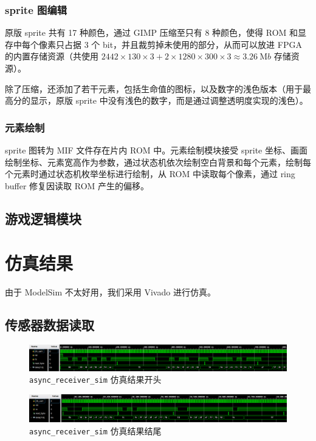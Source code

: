 \documentclass[UTF8, 11pt, fontset=none]{ctexart}
\begin{document}
\subsubsection{sprite 图编辑}

原版 sprite 共有 17 种颜色，通过 GIMP 压缩至只有 8 种颜色，使得 ROM 和显存中每个像素只占据 3 个 bit，并且裁剪掉未使用的部分，从而可以放进 FPGA 的内置存储资源（共使用 $2442 \times 130 \times 3 + 2 \times 1280 \times 300 \times 3 \approx \SI{3.26}{\mega b}$ 存储资源）。

除了压缩，还添加了若干元素，包括生命值的图标，以及数字的浅色版本（用于最高分的显示，原版 sprite 中没有浅色的数字，而是通过调整透明度实现的浅色）。

\subsubsection{元素绘制}

sprite 图转为 MIF 文件存在片内 ROM 中。元素绘制模块接受 sprite 坐标、画面绘制坐标、元素宽高作为参数，通过状态机依次绘制空白背景和每个元素，绘制每个元素时通过状态机枚举坐标进行绘制，从 ROM 中读取每个像素，通过 ring buffer 修复因读取 ROM 产生的偏移。

\subsection{游戏逻辑模块}

\section{仿真结果}

由于 ModelSim 不太好用，我们采用 Vivado 进行仿真。

\subsection{传感器数据读取}

\begin{figure}[H]
    \centering
    \includegraphics[width=\textwidth]{images/uart-sim-begin.png}
    \vspace{-16pt}
    \caption{\texttt{async_receiver_sim} 仿真结果开头}
\end{figure}

\begin{figure}[H]
    \centering
    \includegraphics[width=\textwidth]{images/uart-sim-end.png}
    \vspace{-16pt}
    \caption{\texttt{async_receiver_sim} 仿真结果结尾}
\end{figure}
\end{document}
